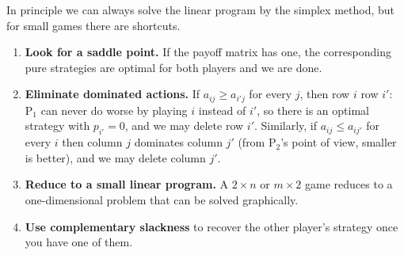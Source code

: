 In principle we can always solve the linear program by the simplex method, but for small games there are shortcuts.
\begin{enumerate}[label=(\arabic*)]
    \item \textbf{Look for a saddle point.} If the payoff matrix has one, the corresponding pure strategies are optimal for both players and we are done.
    \item \textbf{Eliminate dominated actions.} If $a_{ij} \geq a_{i'j}$ for every $j$, then row $i$  row $i'$: $\mathrm{P}_1$ can never do worse by playing $i$ instead of $i'$, so there is an optimal strategy with $p_{i'} = 0$, and we may delete row $i'$. Similarly, if $a_{ij} \leq a_{ij'}$ for every $i$ then column $j$ dominates column $j'$ (from $\mathrm{P}_2$'s point of view, smaller is better), and we may delete column $j'$.
    \item \textbf{Reduce to a small linear program.} A $2 \times n$ or $m\times 2$ game reduces to a one-dimensional problem that can be solved graphically.
    \item \textbf{Use complementary slackness} to recover the other player's strategy once you have one of them.
\end{enumerate}


